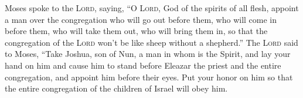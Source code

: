 \begin{inparaenum}
     Moses spoke to the \textsc{Lord}, saying,%
     ``O \textsc{Lord}, God of the spirits of all flesh, appoint a man over the congregation%
     who will go out before them, who will come in before them, who will take them out, who will bring them in, so that the congregation of the \textsc{Lord} won't be like sheep without a shepherd.''%
     The \textsc{Lord} said to Moses, ``Take Joshua, son of Nun, a man in whom is the Spirit, and lay your hand on him%
     and cause him to stand before Eleazar the priest and the entire congregation, and appoint him before their eyes.%
     Put your honor on him so that the entire congregation of the children of Israel will obey him.%
\end{inparaenum}
